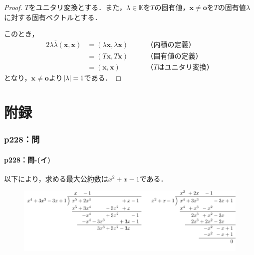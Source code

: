 \documentclass[a4paper,10pt,fleqn]{ltjsarticle}
\begin{document}
\begin{tleftbar}
  \begin{proof}
    $T$をユニタリ変換とする．また，$ \lambda \in \mathbb{K}$を$T$の固有値，$\bm{x} \ne \bm{o}$を$T$の固有値$\lambda$に対する固有ベクトルとする．

    このとき，
    \begin{alignat*}{2}
      \lambda \overline{\lambda} (\bm{x},\bm{x}) & = (\lambda \bm{x},\lambda \bm{x}) & \quad & \text{（内積の定義）}      \\
                                                 & = (T \bm{x},T \bm{x})             &       & \text{（固有値の定義）}     \\
                                                 & = (\bm{x},\bm{x})                 &       & \text{（$T$はユニタリ変換）}
    \end{alignat*}
    となり，$\bm{x} \ne \bm{o}$より$\abs{\lambda} = 1$である．
  \end{proof}
\end{tleftbar}

\newpage

\part*{附録\three}


\section*{p228：問}

\subsection*{p228：問-(イ)}
以下により，求める最大公約数は$x^2+x-1$である．

\begin{figure}[ht]
  \centering
  \includegraphics{emath_figures/p228_toi_i.pdf}
\end{figure}
\end{document}

